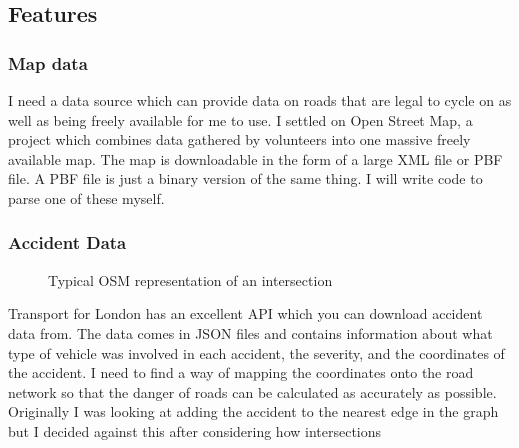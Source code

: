 \documentclass[11pt,twoside,a4paper]{article}
\begin{document}
\subsection{Features}
\subsubsection{Map data}
I need a data source which can provide data on roads that are legal to cycle on as well as being freely available for me to use. I settled on Open Street Map, a project which combines data gathered by volunteers into one massive freely available map. The map is downloadable in the form of a large XML file or PBF file. A PBF file is just a binary version of the same thing. I will write code to parse one of these myself.

\subsubsection{Accident Data}
\begin{figure}
    \begin{center}
\end{center}
    \caption{Typical OSM representation of an intersection}
    \label{intersection}
\end{figure}
Transport for London has an excellent API which you can download accident data from. The data comes in JSON files and contains information about what type of vehicle was involved in each accident, the severity, and the coordinates of the accident. 
I need to find a way of mapping the coordinates onto the road network so that the danger of roads can be calculated as accurately as possible. Originally I was looking at adding the accident to the nearest edge in the graph but I decided against this after considering how intersections 
\end{document}
